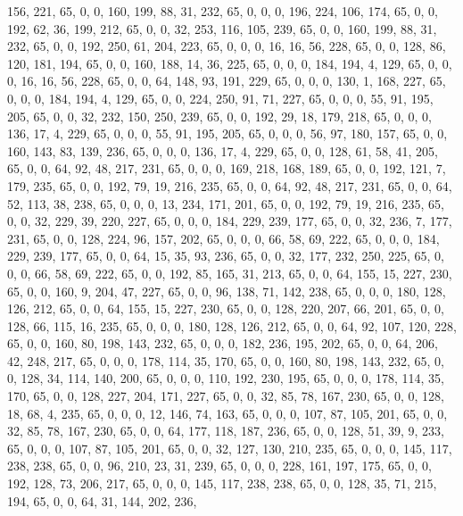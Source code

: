\begin{DoxyCode}
       156, 221, 65, 0, 0, 160, 199, 88, 31, 232, 65, 0, 0, 0, 196, 224, 106, 174, 65, 0, 0, 192, 62, 36, 199,
       212, 65, 0, 0, 32, 253, 116, 105, 239, 65, 0, 0, 160, 199, 88, 31, 232, 65, 0, 0, 192, 250, 61, 204, 223, 65,
       0, 0, 0, 16, 16, 56, 228, 65, 0, 0, 128, 86, 120, 181, 194, 65, 0, 0, 160, 188, 14, 36, 225, 65, 0, 0, 0,
       184, 194, 4, 129, 65, 0, 0, 0, 16, 16, 56, 228, 65, 0, 0, 64, 148, 93, 191, 229, 65, 0, 0, 0, 130, 1, 168, 227,
       65, 0, 0, 0, 184, 194, 4, 129, 65, 0, 0, 224, 250, 91, 71, 227, 65, 0, 0, 0, 55, 91, 195, 205, 65, 0, 0,
       32, 232, 150, 250, 239, 65, 0, 0, 192, 29, 18, 179, 218, 65, 0, 0, 0, 136, 17, 4, 229, 65, 0, 0, 0, 55, 91,
       195, 205, 65, 0, 0, 0, 56, 97, 180, 157, 65, 0, 0, 160, 143, 83, 139, 236, 65, 0, 0, 0, 136, 17, 4, 229, 65,
       0, 0, 128, 61, 58, 41, 205, 65, 0, 0, 64, 92, 48, 217, 231, 65, 0, 0, 0, 169, 218, 168, 189, 65, 0, 0, 192,
       121, 7, 179, 235, 65, 0, 0, 192, 79, 19, 216, 235, 65, 0, 0, 64, 92, 48, 217, 231, 65, 0, 0, 64, 52, 113, 38,
       238, 65, 0, 0, 0, 13, 234, 171, 201, 65, 0, 0, 192, 79, 19, 216, 235, 65, 0, 0, 32, 229, 39, 220, 227, 65,
       0, 0, 0, 184, 229, 239, 177, 65, 0, 0, 32, 236, 7, 177, 231, 65, 0, 0, 128, 224, 96, 157, 202, 65, 0, 0, 0,
       66, 58, 69, 222, 65, 0, 0, 0, 184, 229, 239, 177, 65, 0, 0, 64, 15, 35, 93, 236, 65, 0, 0, 32, 177, 232,
       250, 225, 65, 0, 0, 0, 66, 58, 69, 222, 65, 0, 0, 192, 85, 165, 31, 213, 65, 0, 0, 64, 155, 15, 227, 230, 65,
       0, 0, 160, 9, 204, 47, 227, 65, 0, 0, 96, 138, 71, 142, 238, 65, 0, 0, 0, 180, 128, 126, 212, 65, 0, 0, 64,
       155, 15, 227, 230, 65, 0, 0, 128, 220, 207, 66, 201, 65, 0, 0, 128, 66, 115, 16, 235, 65, 0, 0, 0, 180, 128,
       126, 212, 65, 0, 0, 64, 92, 107, 120, 228, 65, 0, 0, 160, 80, 198, 143, 232, 65, 0, 0, 0, 182, 236, 195,
       202, 65, 0, 0, 64, 206, 42, 248, 217, 65, 0, 0, 0, 178, 114, 35, 170, 65, 0, 0, 160, 80, 198, 143, 232, 65, 0,
       0, 128, 34, 114, 140, 200, 65, 0, 0, 0, 110, 192, 230, 195, 65, 0, 0, 0, 178, 114, 35, 170, 65, 0, 0, 128,
       227, 204, 171, 227, 65, 0, 0, 32, 85, 78, 167, 230, 65, 0, 0, 128, 18, 68, 4, 235, 65, 0, 0, 0, 12, 146, 74,
       163, 65, 0, 0, 0, 107, 87, 105, 201, 65, 0, 0, 32, 85, 78, 167, 230, 65, 0, 0, 64, 177, 118, 187, 236, 65,
       0, 0, 128, 51, 39, 9, 233, 65, 0, 0, 0, 107, 87, 105, 201, 65, 0, 0, 32, 127, 130, 210, 235, 65, 0, 0, 0,
       145, 117, 238, 238, 65, 0, 0, 96, 210, 23, 31, 239, 65, 0, 0, 0, 228, 161, 197, 175, 65, 0, 0, 192, 128, 73,
       206, 217, 65, 0, 0, 0, 145, 117, 238, 238, 65, 0, 0, 128, 35, 71, 215, 194, 65, 0, 0, 64, 31, 144, 202, 236,

\end{DoxyCode}
